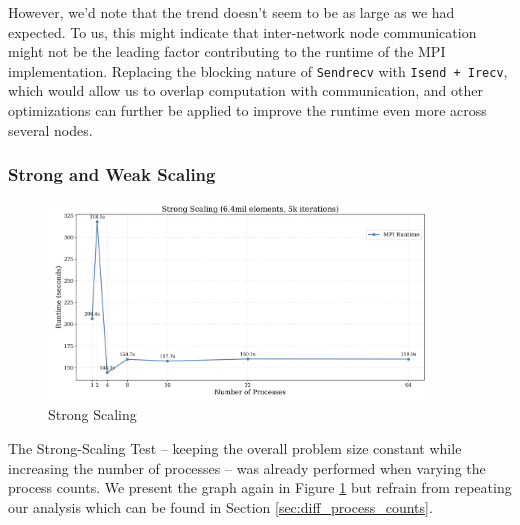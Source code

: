 \documentclass[a4paper,10pt]{article}
\begin{document}
However, we'd note that the trend doesn't seem to be as large as we had expected. To us, this might indicate that inter-network node communication might not be the leading factor contributing to the runtime of the MPI implementation. Replacing the blocking nature of \verb|Sendrecv| with \verb|Isend + Irecv|, which would allow us to overlap computation with communication, and other optimizations can further be applied to improve the runtime even more across several nodes. 

\subsubsection{Strong and Weak Scaling}
\begin{figure}[H]
  \centering
  \includegraphics[width=0.9\textwidth]{img/ex1/strong_scaling}
  \caption{Strong Scaling}
  \label{fig:ex1_strong_scaling}
\end{figure}

The Strong-Scaling Test -- keeping the overall problem size constant while increasing the number of processes -- was already performed when varying the process counts. We present the graph again in Figure \ref{fig:ex1_strong_scaling} but refrain from repeating our analysis which can be found in Section \ref{sec:diff_process_counts}. 
\end{document}
